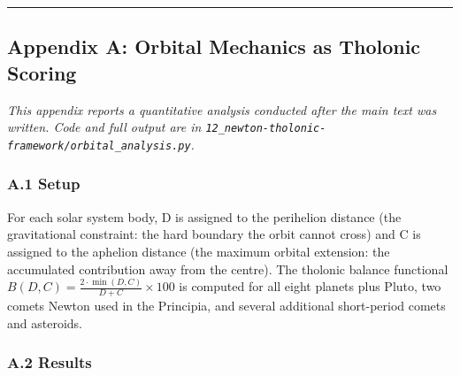 \documentclass[
  11pt,
  letterpaper,
]{article}
\begin{document}
\begin{center}\rule{0.5\linewidth}{0.5pt}\end{center}

\subsection{Appendix A: Orbital Mechanics as Tholonic
Scoring}\label{appendix-a-orbital-mechanics-as-tholonic-scoring}

\emph{This appendix reports a quantitative analysis conducted after the
main text was written. Code and full output are in
\texttt{12\_newton-tholonic-framework/orbital\_analysis.py}.}

\subsubsection{A.1 Setup}\label{a.1-setup}

For each solar system body, D is assigned to the perihelion distance
(the gravitational constraint: the hard boundary the orbit cannot cross)
and C is assigned to the aphelion distance (the maximum orbital
extension: the accumulated contribution away from the centre). The
tholonic balance functional
\(B(D,C) = \frac{2 \cdot \min(D,C)}{D+C} \times 100\) is computed for
all eight planets plus Pluto, two comets Newton used in the Principia,
and several additional short-period comets and asteroids.

\subsubsection{A.2 Results}\label{a.2-results}
\end{document}
